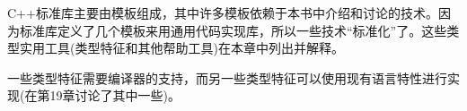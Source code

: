 C++标准库主要由模板组成，其中许多模板依赖于本书中介绍和讨论的技术。因为标准库定义了几个模板来用通用代码实现库，所以一些技术“标准化”了。这些类型实用工具(类型特征和其他帮助工具)在本章中列出并解释。

一些类型特征需要编译器的支持，而另一些类型特征可以使用现有语言特性进行实现(在第19章讨论了其中一些)。